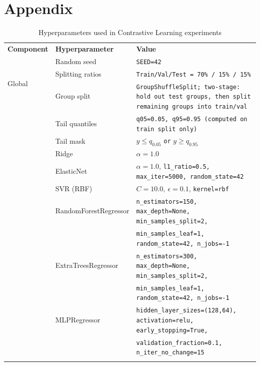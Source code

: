 \documentclass[preprint,12pt]{elsarticle}
\begin{document}

\appendix
\section{Appendix}

\begin{table}[!h]
\centering
\small
\caption{Hyperparameters used in Contrastive Learning experiments}

\label{tab:hyperparams_cl}
\begin{tabular}{
p{3.2cm}
p{3.6cm}
>{\raggedright\arraybackslash}p{8.2cm}
}
\toprule
\textbf{Component} & \textbf{Hyperparameter} & \textbf{Value} \\
\cmidrule(lr){1-3}


\multirow{3}{*}{Global}
& Random seed & \texttt{SEED=42} \\
& Splitting ratios & \texttt{Train/Val/Test = 70\% / 15\% / 15\%} \\
& Group split & \texttt{GroupShuffleSplit; two-stage: hold out test groups, then split remaining groups into train/val} \\
\addlinespace
\cmidrule(lr){1-3}


\multirow{2}{*}{Tail (for reporting)}
& Tail quantiles & \texttt{q05=0.05, q95=0.95 (computed on train split only)} \\
& Tail mask & \(y \le q_{0.05}\) \texttt{or} \(y \ge q_{0.95}\) \\
\addlinespace
\cmidrule(lr){1-3}


\multirow{6}{*}{Baselines (sklearn)}
& Ridge & \(\alpha=1.0\) \\
& ElasticNet & \(\alpha=1.0\), \texttt{l1\_ratio=0.5, max\_iter=5000, random\_state=42} \\
& SVR (RBF) & \(\!C=10.0,\ \epsilon=0.1\), \texttt{kernel=rbf} \\
& RandomForestRegressor & \texttt{n\_estimators=150, max\_depth=None, min\_samples\_split=2,}\\
& & \texttt{min\_samples\_leaf=1, random\_state=42, n\_jobs=-1} \\
& ExtraTreesRegressor & \texttt{n\_estimators=300, max\_depth=None, min\_samples\_split=2,}\\
& & \texttt{min\_samples\_leaf=1, random\_state=42, n\_jobs=-1} \\
& MLPRegressor & \texttt{hidden\_layer\_sizes=(128,64), activation=relu, early\_stopping=True,}\\
& & \texttt{validation\_fraction=0.1, n\_iter\_no\_change=15} \\
\addlinespace
\cmidrule(lr){1-3}



\end{tabular}
\end{table}
\end{document}
